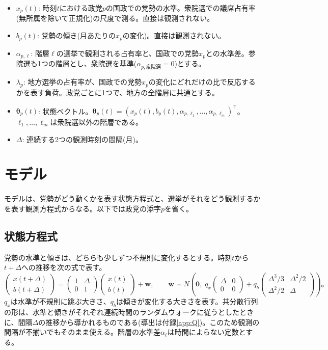 \documentclass[a4paper,11pt]{ltjsarticle}
\begin{document}
\begin{itemize}
  \item $x_p(t)$: 時刻$t$における政党$p$の国政での党勢の水準。衆院選での議席占有率(無所属を除いて正規化)の尺度で測る。直接は観測されない。
  \item $b_p(t)$: 党勢の傾き(月あたりの$x_p$の変化)。直接は観測されない。
  \item $\alpha_{p,\ell}$: 階層$\ell$の選挙で観測される占有率と、国政での党勢$x_p$との水準差。参院選も1つの階層とし、衆院選を基準($\alpha_{p,\text{衆院選}}=0$)とする。
  \item $\lambda_p$: 地方選挙の占有率が、国政での党勢$x_p$の変化にどれだけの比で反応するかを表す負荷。政党ごとに1つで、地方の全階層に共通とする。
  \item $\boldsymbol{\theta}_p(t)$: 状態ベクトル。$\boldsymbol{\theta}_p(t)=(x_p(t), b_p(t), \alpha_{p,\ell_1},\dots,\alpha_{p,\ell_m})^\top$。$\ell_1,\dots,\ell_m$は衆院選以外の階層である。
  \item $\Delta$: 連続する2つの観測時刻の間隔(月)。
\end{itemize}

\section{モデル}
\label{sec:model}

モデルは、党勢がどう動くかを表す状態方程式と、選挙がそれをどう観測するかを表す観測方程式からなる。以下では政党の添字$p$を省く。

\subsection{状態方程式}

党勢の水準と傾きは、どちらも少しずつ不規則に変化するとする。時刻$t$から$t+\Delta$への推移を次の式で表す。
\begin{equation}
  \begin{pmatrix} x(t+\Delta) \\ b(t+\Delta) \end{pmatrix}
  = \begin{pmatrix} 1 & \Delta \\ 0 & 1 \end{pmatrix}
    \begin{pmatrix} x(t) \\ b(t) \end{pmatrix} + \boldsymbol{w},
  \qquad
  \boldsymbol{w}\sim N\!\left(\boldsymbol{0},\;
  q_x\begin{pmatrix}\Delta & 0\\ 0 & 0\end{pmatrix}
  + q_b\begin{pmatrix}\Delta^3/3 & \Delta^2/2\\ \Delta^2/2 & \Delta\end{pmatrix}\right)。
  \label{eq:state}
\end{equation}
$q_x$は水準が不規則に跳ぶ大きさ、$q_b$は傾きが変化する大きさを表す。共分散行列の形は、水準と傾きがそれぞれ連続時間のランダムウォークに従うとしたときに、間隔$\Delta$の推移から導かれるものである(導出は付録\ref{app:Q})。このため観測の間隔が不揃いでもそのまま使える。階層の水準差$\alpha_\ell$は時間によらない定数とする。
\end{document}
